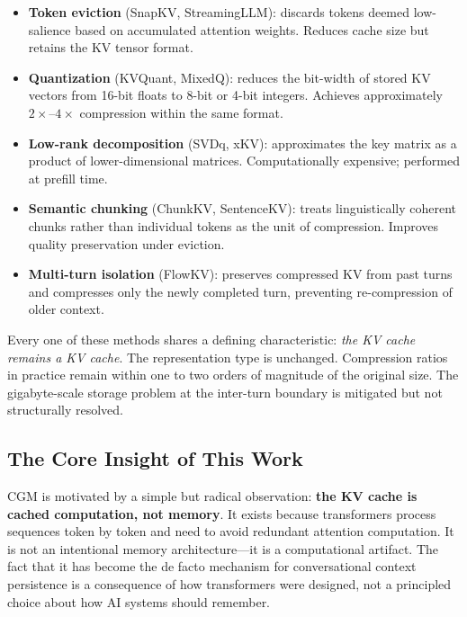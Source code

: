 \documentclass[11pt, a4paper, twoside]{article}
\theoremstyle{definition}
\newcommand{\CGM}{\textsc{CGM}\xspace}
\begin{document}
\begin{itemize}[leftmargin=*]
  \item \textbf{Token eviction} (SnapKV, StreamingLLM): discards tokens deemed
    low-salience based on accumulated attention weights. Reduces cache size but
    retains the KV tensor format.
  \item \textbf{Quantization} (KVQuant, MixedQ): reduces the bit-width of stored
    KV vectors from 16-bit floats to 8-bit or 4-bit integers. Achieves
    approximately $2\times$--$4\times$ compression within the same format.
  \item \textbf{Low-rank decomposition} (SVDq, xKV): approximates the key
    matrix as a product of lower-dimensional matrices. Computationally expensive;
    performed at prefill time.
  \item \textbf{Semantic chunking} (ChunkKV, SentenceKV): treats
    linguistically coherent chunks rather than individual tokens as the unit of
    compression. Improves quality preservation under eviction.
  \item \textbf{Multi-turn isolation} (FlowKV): preserves compressed KV from past
    turns and compresses only the newly completed turn, preventing re-compression
    of older context.
\end{itemize}

\medskip

Every one of these methods shares a defining characteristic: \textit{the KV cache
remains a KV cache}. The representation type is unchanged. Compression ratios in
practice remain within one to two orders of magnitude of the original size. The
gigabyte-scale storage problem at the inter-turn boundary is mitigated but not
structurally resolved.

\subsection{The Core Insight of This Work}

\CGM is motivated by a simple but radical observation: \textbf{the KV cache is cached
computation, not memory}. It exists because transformers process sequences token by
token and need to avoid redundant attention computation. It is not an intentional
memory architecture---it is a computational artifact. The fact that it has become the
de facto mechanism for conversational context persistence is a consequence of how
transformers were designed, not a principled choice about how AI systems should remember.

\medskip
\end{document}
